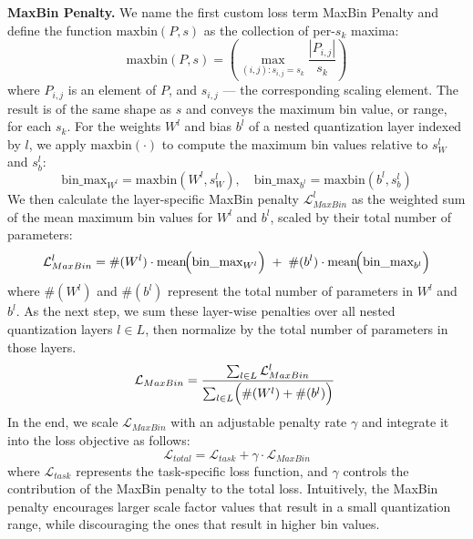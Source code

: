 \textbf{MaxBin Penalty.} We name the first custom loss term MaxBin Penalty and
define the function \( \text{maxbin}(P, s) \) 
as the collection of per-\( s_k\) maxima:
\[
\text{maxbin}(P, s) = \left( \max_{(i,j) : s_{i,j} = s_k} \frac{|P_{i,j}|}{s_k} \right)
\]
where \( P_{i,j} \) is an element of \( P \), and \( s_{i,j} \) — the corresponding scaling element. 
The result is of the same shape as \(s \) and conveys the maximum bin value, or range, for each \( s_k\).
For the weights \(W^l\) and bias \( b^l\) of a nested quantization layer indexed by \( l \), 
we apply \( \text{maxbin}( \cdot)\) to compute the maximum bin values relative to
\(s_W^l \) and \( s_b^l\):
\[
\text{bin\_max}_{W^l} = \text{maxbin}(W^l, s_W^l), 
\quad 
\text{bin\_max}_{b^l}  = \text{maxbin}(b^l, s_b^l)
\]
We then calculate the layer-specific MaxBin penalty \( \mathcal{L}_{MaxBin}^l\)
as the weighted sum of the mean maximum bin values for \(W^l\) and \( b^l\), 
scaled by their total number of parameters:
\[
\mathcal{L}_{MaxBin}^l 
= 
\#(W^l) \cdot \mathrm{mean}\!\Bigl(\text{bin\_max}_{W^l}\Bigr) 
\;+\;
\#(b^l) \cdot \mathrm{mean}\!\Bigl(\text{bin\_max}_{b^l}\Bigr)
\]
where \( \#(W^l) \) and \( \#(b^l) \) represent the total number of parameters in \( W^l \) and \( b^l \).
As the next step, we sum these layer-wise penalties over all nested quantization layers \( l \in L \), 
then normalize by the total number of parameters in those layers. 
\[
\mathcal{L}_{MaxBin}
=
\frac{\sum_{l \in L}
\mathcal{L}_{MaxBin}^l}{\sum_{l \in L} \Bigl(\#(W^l) + \#(b^l)\Bigr)}
\
\]
In the end, we scale \( \mathcal{L}_{MaxBin} \) with an adjustable penalty rate \( \gamma \) 
and integrate it into the loss objective as follows:
\[
\mathcal{L}_{total} = \mathcal{L}_{task} + \gamma \cdot \mathcal{L}_{MaxBin}
\]
where \( \mathcal{L}_{task} \) represents the task-specific loss function,
and \( \gamma \) controls the contribution of the MaxBin penalty to the total loss.
Intuitively, the MaxBin penalty encourages larger scale factor values 
that result in a small quantization range, while
discouraging the ones that result in higher bin values.

